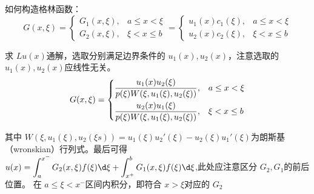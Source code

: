 \documentclass{article}
\begin{document}
如何构造格林函数：
$$G(x,\xi )=
\begin{cases}
    G_1(x,\xi ),&a \le x<\xi \\
    G_2(x,\xi ),&\xi <x \le b
\end{cases}
=
\begin{cases}
    u_1(x)c_1(\xi ),&a \le x<\xi \\
    u_2(x)c_2(\xi ),&\xi <x \le b
\end{cases}
$$

求 $Lu(x)$通解，选取分别满足边界条件的 $u_1(x),u_2(x)$，注意选取的 $u_1(x),u_2(x)$应线性无关。
$$G(x,\xi )=
\begin{dcases}
     \frac{u_1(x)u_2(\xi )}{p(\xi )W(\xi ,u_1(\xi ),u_2(\xi ))},&a \le x < \xi  \\
     \frac{u_2(x)u_1(\xi )}{p(\xi )W(\xi ,u_1(\xi ),u_2(\xi ))},&\xi <x \le b
\end{dcases}
$$

其中 $W(\xi,u_1(\xi ),u_2(\xi s) )=u_1(\xi )u_2'(\xi )-u_2(\xi )u_1'(\xi )$为朗斯基（wronskian）行列式。最后可得 $\displaystyle u(x)=\int_a^{x^-}G_2(x,\xi )f(\xi ) \d \xi + \int_{x^+}^b G_1(x,\xi )f(\xi ) \d \xi $,此处应注意区分 $G_2,G_1$的前后位置。
在 $a \le  \xi <x^-$区间内积分，即符合 $x>\xi $对应的 $G_2$
\end{document}
